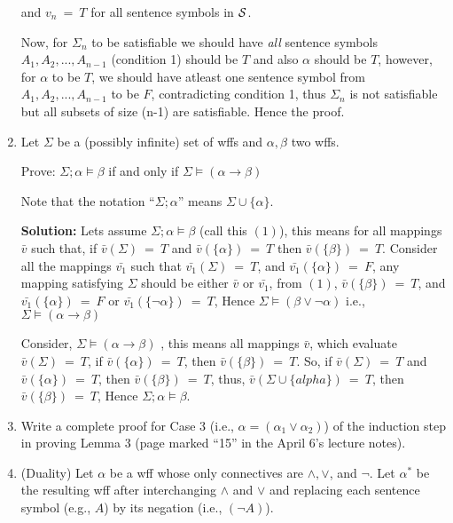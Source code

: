 \documentclass[12pt,letterpaper]{article}
\begin{document}
\begin{enumerate}
  and $v_{n}\ =\ T$ for all sentence symbols in $\cal S$.
  
  Now, for $\Sigma_{n}$ to be satisfiable we should have \textit{all} sentence symbols $A_{1}, A_{2},...,A_{n-1}$ (condition 1) should be $T$ and also $\alpha$ should be $T$, however, for $\alpha$ to be $T$, we should have atleast one sentence symbol from  $A_{1}, A_{2},...,A_{n-1}$ to be $F$, contradicting condition 1, thus $\Sigma_{n}$ is not satisfiable but all subsets of size (n-1) are satisfiable. Hence the proof.
  	
  

\item
  Let $\Sigma$ be a (possibly infinite) set of wffs and
  $\alpha,\beta$ two wffs.

  Prove: $\Sigma;\alpha\models\beta$ if and only if
  $\Sigma\models (\alpha\rightarrow\beta)$

  Note that the notation ``$\Sigma;\alpha$'' means $\Sigma\cup\{\alpha\}$.
  
  \textbf{Solution:} Lets assume $\Sigma;\alpha\models\beta$  (call this $(1)$), this means for all mappings $\bar{v}$ such that, if $\bar{v}(\Sigma)\ =\ T$ and $\bar{v}(\{\alpha\})\ =\ T$ then $\bar{v}(\{\beta\})\ =\ T$. 
  Consider all the mappings $\bar{v_{1}}$ such that $\bar{v_{1}}(\Sigma)\ =\ T$, and $\bar{v_{1}}(\{\alpha\})\ =\ F$, any mapping satisfying $\Sigma$ should be either $\bar{v}$ or $\bar{v_{1}}$, from $(1)$, $\bar{v}(\{\beta\})\ =\ T$, and $\bar{v_{1}}(\{\alpha\})\ =\ F$ or $\bar{v_{1}}(\{\lnot \alpha\})\ =\ T$, Hence $\Sigma\models (\beta \lor \lnot \alpha)$ i.e., 
$\Sigma\models (\alpha\rightarrow\beta)$

Consider, $\Sigma\models (\alpha\rightarrow\beta)$ , this means all mappings $\bar{v}$, which evaluate $\bar{v}(\Sigma)\ =\ T$, if $\bar{v}(\{\alpha\})\ =\ T$, then $\bar{v}(\{\beta\})\ =\ T$.
So, if $\bar{v}(\Sigma)\ =\ T$ and $\bar{v}(\{\alpha\})\ =\ T$, then $\bar{v}(\{\beta\})\ =\ T$, thus,
$\bar{v}(\Sigma \cup \{alpha\})\ =\ T$, then $\bar{v}(\{\beta\})\ =\ T$, Hence $\Sigma;\alpha\models\beta$.
\item
  Write a complete proof for Case 3
  (i.e., $\alpha=(\alpha_1\lor\alpha_2)$)
  of the induction step in proving
  Lemma 3 (page marked ``15'' in the April 6's lecture notes).

\item 
  (Duality)
  Let $\alpha$ be a wff whose only connectives are $\land,\lor$,
  and $\neg$.
  Let $\alpha^*$ be the resulting wff after interchanging $\land$
  and $\lor$ and replacing each sentence symbol (e.g., $A$) by its
  negation (i.e., $(\neg A)$).
  

\end{enumerate}
\end{document}
